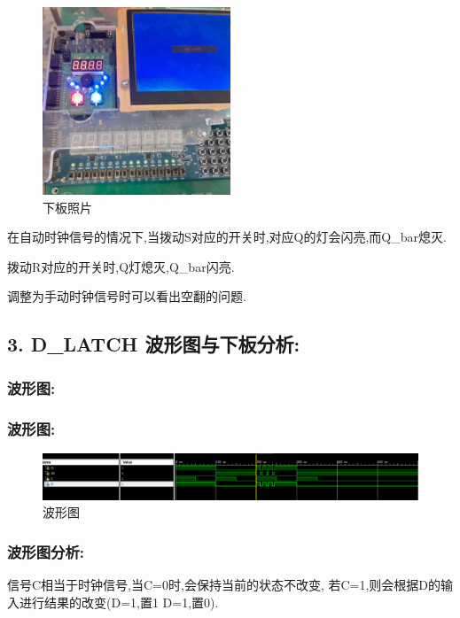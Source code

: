 \documentclass{article}
\begin{document}
    \begin{figure}[H]
    \centering
    \includegraphics[width=0.5\textwidth]{lab9p/22.jpg}
    \caption{\label{Lab9}下板照片}
    \end{figure}

在自动时钟信号的情况下,当拨动S对应的开关时,对应Q的灯会闪亮,而Q\_bar熄灭.

拨动R对应的开关时,Q灯熄灭,Q\_bar闪亮.

调整为手动时钟信号时可以看出空翻的问题.

\subsection*{3. D\_LATCH 波形图与下板分析:}

\subsubsection*{波形图:}
    \subsubsection*{波形图:}
    \begin{figure}[H]
    \centering
    \includegraphics[width=1\textwidth]{lab9p/3.png}
    \caption{\label{Lab9}波形图}
    \end{figure}

\subsubsection*{波形图分析:}
信号C相当于时钟信号,当C=0时,会保持当前的状态不改变,
若C=1,则会根据D的输入进行结果的改变(D=1,置1 D=1,置0).
\end{document}
